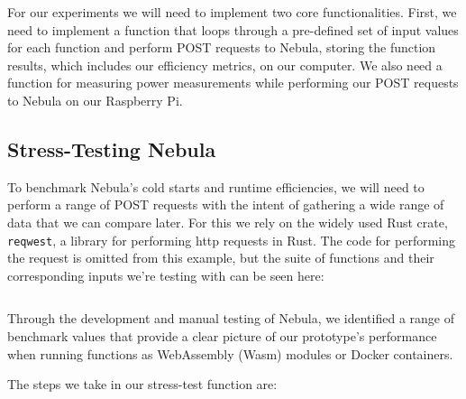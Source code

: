 \documentclass[
  table]{report}
\begin{document}
For our experiments we will need to implement two core functionalities.
First, we need to implement a function that loops through a pre-defined
set of input values for each function and perform POST requests to
Nebula, storing the function results, which includes our efficiency
metrics, on our computer. We also need a function for measuring power
measurements while performing our POST requests to Nebula on our
Raspberry Pi.

\subsection{Stress-Testing Nebula}
\label{sect:stress_test}

To benchmark Nebula's cold starts and runtime efficiencies, we will need
to perform a range of POST requests with the intent of gathering a wide
range of data that we can compare later. For this we rely on the widely
used Rust crate, \texttt{reqwest}, a library for performing http
requests in Rust. The code for performing the request is omitted from
this example, but the suite of functions and their corresponding inputs
we're testing with can be seen here:

\newpage

\inputminted{rust}{assets/code/request.rs}

Through the development and manual testing of Nebula, we identified a
range of benchmark values that provide a clear picture of our
prototype's performance when running functions as WebAssembly (Wasm)
modules or Docker containers.

The steps we take in our stress-test function are:
\end{document}
